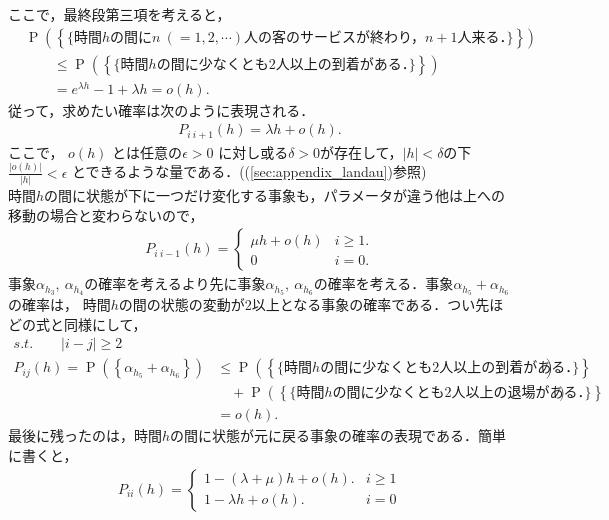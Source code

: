 \documentclass[a4j,papersize,disablejfam,slide,14pt]{jsarticle}
\def\exp#1{e^{#1}} %
\def\prob#1{\operatorname{P} \left(\left\{ #1 \right\}\right)} %
\begin{document}
    ここで，最終段第三項を考えると，
    \begin{align}
    		&\prob{\mbox{\{ 時間$h$の間に$n\ (=1,2,\cdots)$人の客のサービスが終わり，$n+1$人来る．\}}} \\
            &\qquad\leq \prob{\mbox{\{ 時間$h$の間に少なくとも$2$人以上の到着がある．\}}} \\
        	&\qquad= \exp{\lambda h} - 1 + \lambda h = o(h). & \label{eq:more_than_two_arrival}
    \end{align}
    従って，求めたい確率は次のように表現される．
    \begin{align}
        P_{i\ i+1}(h) = \lambda h + o(h).
    \end{align}
    ここで， $o(h)$ とは任意の$\epsilon > 0$ に対し或る$\delta >0$が存在して，$|h| < \delta$の下$\frac{|o(h)|}{|h|} < \epsilon$ とできるような量である．((\ref{sec:appendix_landau})参照) \\
    時間$h$の間に状態が下に一つだけ変化する事象も，パラメータが違う他は上への移動の場合と変わらないので，
    \begin{align}
        P_{i\ i-1}(h) = 
        \begin{cases}
        	\mu h + o(h) & \text{$i \geq 1$}. \\
            0 & \text{$i = 0$}.
        \end{cases}
    \end{align}
    事象$\alpha_h_3,\ \alpha_h_4$の確率を考えるより先に事象$\alpha_h_5,\ \alpha_h_6$の確率を考える．事象$\alpha_h_5 + \alpha_h_6$の確率は，
    時間$h$の間の状態の変動が$2$以上となる事象の確率である．つい先ほどの式と同様にして，
    \begin{align}
    	s.t.\qquad |i - j| \geq 2 \\
    	P_{ij}(h) = \prob{\alpha_h_5 + \alpha_h_6}
    	&\leq \prob{\mbox{\{ 時間$h$の間に少なくとも$2$人以上の到着がある．\}}} \\
        &\quad+ \prob{\mbox{\{ 時間$h$の間に少なくとも$2$人以上の退場がある．\}}} \\
        &= o(h). &\label{eq:trans_mt2}
    \end{align}
    最後に残ったのは，時間$h$の間に状態が元に戻る事象の確率の表現である．簡単に書くと，
    \begin{align}
    	P_{ii}(h) =
        \begin{cases} 
        	1 - (\lambda + \mu) h + o(h). & \text{$i \geq 1$} \\
            1 - \lambda h + o(h). & \text{$i = 0$}
        \end{cases}
    \end{align}
\end{document}
